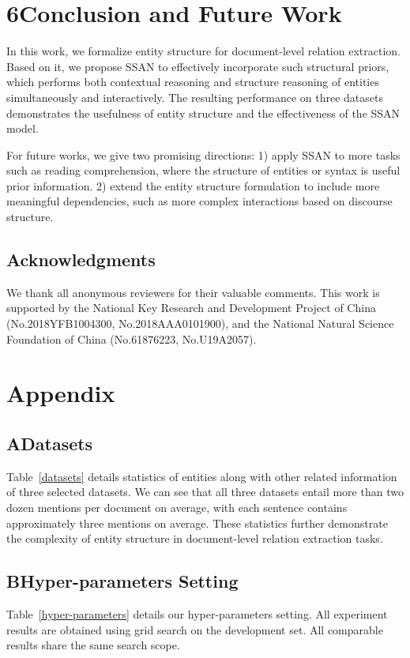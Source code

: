 \documentclass[letterpaper]{article} \usepackage{aaai21}  \usepackage{times}  \usepackage{helvet} \usepackage{courier}  \usepackage[hyphens]{url}  \usepackage{graphicx} \usepackage{booktabs}
\begin{document}
\section{6\quad Conclusion and Future Work}
In this work, we formalize entity structure for document-level relation extraction.
Based on it, we propose SSAN to effectively incorporate such structural priors, which performs both contextual reasoning and structure reasoning of entities simultaneously and interactively.
The resulting performance on three datasets demonstrates the usefulness of entity structure and the effectiveness of the SSAN model.

For future works, we give two promising directions: 1) apply SSAN to more tasks such as reading comprehension, where the structure of entities or syntax is useful prior information. 2) extend the entity structure formulation to include more meaningful dependencies, such as more complex interactions based on discourse structure.

\subsection{Acknowledgments}
We thank all anonymous reviewers for their valuable comments. This work is supported by the National Key Research and Development Project of China (No.2018YFB1004300, No.2018AAA0101900), and the National Natural Science Foundation of China (No.61876223, No.U19A2057).

\section{Appendix}
\subsection{A\quad Datasets}\label{appendix:a}
Table~\ref{datasets} details statistics of entities along with other related information of three selected datasets.
We can see that all three datasets entail more than two dozen mentions per document on average, with each sentence contains approximately three mentions on average.
These statistics further demonstrate the complexity of entity structure in document-level relation extraction tasks.

\subsection{B\quad Hyper-parameters Setting}\label{appendix:b}
Table~\ref{hyper-parameters} details our hyper-parameters setting.
All experiment results are obtained using grid search on the development set.
All comparable results share the same search scope.


\bigskip


\end{document}
